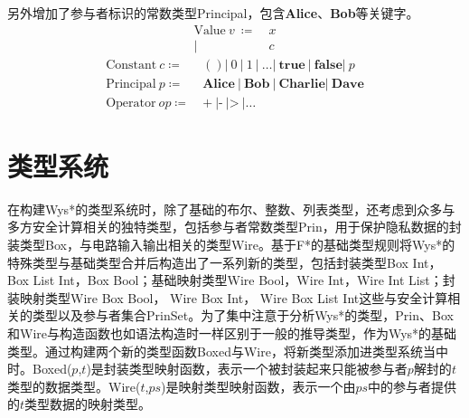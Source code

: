 另外增加了参与者标识的常数类型Principal，包含\textbf{Alice}、\textbf{Bob}等关键字。
\begin{equation*}
\begin{split}
\text{Value}\ v\  \coloneqq &\ x  \\
\vert &\ c 
\end{split}
\end{equation*}
\begin{equation*}
\begin{split}
\text{Constant}\ c \coloneqq &\ () \vert\ 0\ \vert\ 1\ \vert\ \dots \vert\ \textbf{true}\ \vert\ \textbf{false} \vert\ p \\
\text{Principal}\ p \coloneqq &\ \textbf{Alice}\ \vert\ \textbf{Bob}\ \vert\ \textbf{Charlie} \vert\ \textbf{Dave} \\
\text{Operator}\ op \coloneqq &\ \textbf{+}\ | \textbf{-}\ | \textbf{>}\ | \dots  
\end{split}
\end{equation*}
\section{类型系统}
在构建Wys*的类型系统时，除了基础的布尔、整数、列表类型，还考虑到众多与多方安全计算相关的独特类型，包括参与者常数类型Prin，用于保护隐私数据的封装类型Box，与电路输入输出相关的类型Wire。基于F*的基础类型规则将Wys*的特殊类型与基础类型合并后构造出了一系列新的类型，包括封装类型Box Int，Box List Int，Box Bool；基础映射类型Wire Bool，Wire Int，Wire Int List；封装映射类型Wire Box Bool， Wire Box Int， Wire Box List Int这些与安全计算相关的类型以及参与者集合PrinSet。为了集中注意于分析Wys*的类型，Prin、Box和Wire与构造函数也如语法构造时一样区别于一般的推导类型，作为Wys*的基础类型。通过构建两个新的类型函数Boxed与Wire，将新类型添加进类型系统当中时。Boxed($p$,$t$)是封装类型映射函数，表示一个被封装起来只能被参与者$p$解封的$t$类型的数据类型。Wire($t$,$ps$)是映射类型映射函数，表示一个由$ps$中的参与者提供的$t$类型数据的映射类型。

